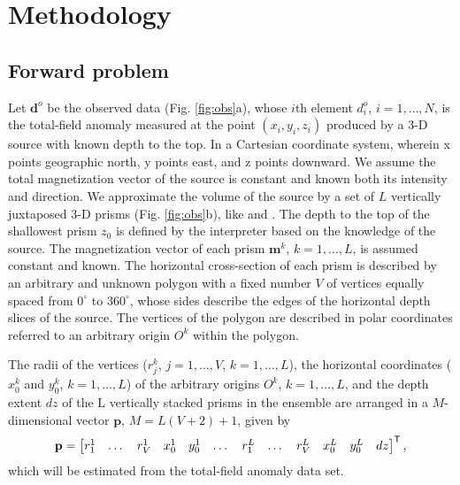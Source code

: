 \section{Methodology}\label{sec:metodo}

\subsection{Forward problem}

Let $\mathbf{d}^o$ be the observed data (Fig. \ref{fig:obs}a), whose $i$th element $d^o_i$, $i = 1, \dots, N$, is the total-field anomaly measured at the point $(x_i, y_i, z_i)$ produced by a 3-D source with known depth to the top. In a Cartesian coordinate system, wherein x points geographic north, y points east, and z points downward. We assume the total magnetization vector of the source is constant and known both its intensity and direction. We approximate the volume of the source by a set of $L$ vertically juxtaposed 3-D prisms (Fig. \ref{fig:obs}b), like \citet{oliveirajr-etal2011} and \citet{oliveirajr-barbosa2013}. The depth to the top of the shallowest prism $z_0$ is defined by the interpreter based on the knowledge of the source. The magnetization vector of each prism $\mathbf{m}^k$, $k=1,\dots ,L$, is assumed constant and known. The horizontal cross-section of each prism is described by an arbitrary and unknown polygon with a fixed number $V$ of vertices equally spaced from $0^{\circ}$ to $360^{\circ}$, whose sides describe the edges of the horizontal depth slices of the source. The vertices of the polygon are described in polar coordinates referred to an arbitrary origin $O^k$ within the polygon. 

The radii of the vertices ($r^k_j$, $j=1,\dots , V$, $k=1,\dots ,L$), the horizontal coordinates ($x_0^k$ and $y_0^k$, $k=1,\dots ,L$) of the arbitrary origins $O^k$, $k=1,\dots ,L$, and the depth extent $dz$ of the L vertically stacked prisms in the ensemble are arranged in a $M$-dimensional vector $\mathbf{p}$, $M = L (V + 2) + 1$, given by
\begin{equation}
    \mathbf{p} =
    \left[ \begin{array}{@{}*{12}{c}@{}}
        r_1^1 & \dots & r_V^1 & x_0^1 & y_0^1 & \dots & r_1^L & \dots & r_V^L & x_0^L & y_0^L & dz\\
    \end{array} \right]^{\mathsf{T}},
\end{equation}
which will be estimated from the total-field anomaly data set.

